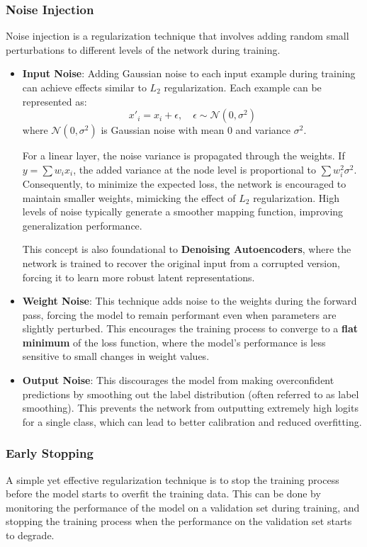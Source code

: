 \subsubsection{Noise Injection}
Noise injection is a regularization technique that involves adding random small perturbations to different 
levels of the network during training.
\begin{itemize}
    \item \textbf{Input Noise}: Adding Gaussian noise to each input example during training can achieve effects similar to $L_2$ regularization. 
    Each example can be represented as:
    \[ x'_i = x_i + \epsilon, \quad \epsilon \sim \mathcal{N}(0, \sigma^2) \]
    where $\mathcal{N}(0, \sigma^2)$ is Gaussian noise with mean 0 and variance $\sigma^2$. 

    For a linear layer, the noise variance is propagated through the weights. 
    If $y = \sum w_i x_i$, the added variance at the node level is proportional to $\sum w_i^2 \sigma^2$. 
    Consequently, to minimize the expected loss, the network is encouraged to maintain smaller weights, mimicking the effect of $L_2$ regularization. 
    High levels of noise typically generate a smoother mapping function, improving generalization performance.

    This concept is also foundational to \textbf{Denoising Autoencoders}, where the network is trained to recover the original input 
    from a corrupted version, forcing it to learn more robust latent representations.

    \item \textbf{Weight Noise}: This technique adds noise to the weights during the forward pass, 
    forcing the model to remain performant even when parameters are slightly perturbed. 
    This encourages the training process to converge to a \textbf{flat minimum} of the loss function, 
    where the model's performance is less sensitive to small changes in weight values.

    \item \textbf{Output Noise}: This discourages the model from making overconfident predictions by smoothing out the label distribution (often referred to as label smoothing). 
    This prevents the network from outputting extremely high logits for a single class, which can lead to better calibration and reduced overfitting.
\end{itemize}

\subsubsection{Early Stopping}
A simple yet effective regularization technique is to stop the training process before the model starts to overfit the training data.
This can be done by monitoring the performance of the model on a validation set during training, and stopping the training process when the 
performance on the validation set starts to degrade.

